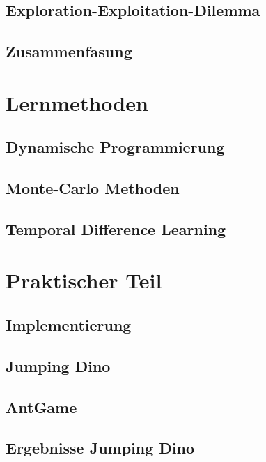 \documentclass[12pt]{scrartcl}
\numberwithin{equation}{section}
\begin{document}
	\subsection{Exploration-Exploitation-Dilemma}\label{sec:explorationDilemma}
	

	\subsection{Zusammenfasung}
	
\pagebreak
\section{Lernmethoden}\label{sec:Lernmethoden}
	\subsection{Dynamische Programmierung}
	
	\subsection{Monte-Carlo Methoden}\label{sec:MC}
	
	\subsection{Temporal Difference Learning}\label{sec:TD}
	

\pagebreak
\section{Praktischer Teil}\label{sec:praktischerTeil}
	
	\subsection{Implementierung}
	
	\subsection{Jumping Dino}
	
	\subsection{AntGame}
	
	\subsection{Ergebnisse Jumping Dino}\label{sec:ergbJD}
	
\end{document}
